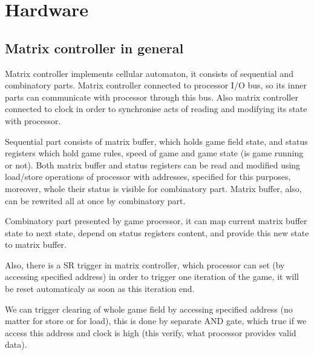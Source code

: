 \chapter*{Hardware}

\section*{Matrix controller in general}

Matrix controller implements cellular automaton, it consists of sequential and combinatory parts. Matrix controller connected to processor I/O bus, so its inner parts can communicate with processor through this bus. Also matrix controller connected to clock in order to synchronise acts of reading and modifying its state with processor.

Sequential part consists of matrix buffer, which holds game field state, and status registers  which hold game rules, speed of game and game state (is game running or not). Both matrix buffer and status registers can be read and modified using load/store operations of processor with addresses, specified for this purposes, moreover, whole their status is visible for combinatory part. Matrix buffer, also, can be rewrited all at once by combinatory part.

Combinatory part presented by game processor, it can map current matrix buffer state to next state, depend on status registers content, and provide this new state to matrix buffer.

Also, there is a SR trigger in matrix controller, which processor can set (by accessing specified address) in order to trigger one iteration of the game, it will be reset automaticaly as soon as this iteration end.

We can trigger clearing of whole game field by accessing specified address (no matter for store or for load), this is done by separate AND gate, which true if we access this address and clock is high (this verify, what processor provides valid data).

